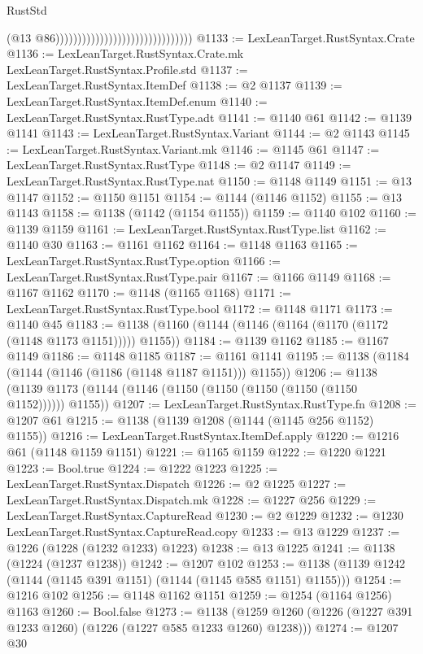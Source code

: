\begin{lexlean}{RustStd}
\begin{coremodule}
{\begin{coremodule}
{{{{{{{{{{{{{{{{{{{{{{{{{{{{{{{{{{                                                                (@13
                                                                  @86)))))))))))))))))))))))))))))))
@1133 := LexLeanTarget.RustSyntax.Crate
@1136 := LexLeanTarget.RustSyntax.Crate.mk LexLeanTarget.RustSyntax.Profile.std
@1137 := LexLeanTarget.RustSyntax.ItemDef
@1138 := @2 @1137
@1139 := LexLeanTarget.RustSyntax.ItemDef.enum
@1140 := LexLeanTarget.RustSyntax.RustType.adt
@1141 := @1140 @61
@1142 := @1139 @1141
@1143 := LexLeanTarget.RustSyntax.Variant
@1144 := @2 @1143
@1145 := LexLeanTarget.RustSyntax.Variant.mk
@1146 := @1145 @61
@1147 := LexLeanTarget.RustSyntax.RustType
@1148 := @2 @1147
@1149 := LexLeanTarget.RustSyntax.RustType.nat
@1150 := @1148 @1149
@1151 := @13 @1147
@1152 := @1150 @1151
@1154 := @1144 (@1146 @1152)
@1155 := @13 @1143
@1158 := @1138 (@1142 (@1154 @1155))
@1159 := @1140 @102
@1160 := @1139 @1159
@1161 := LexLeanTarget.RustSyntax.RustType.list
@1162 := @1140 @30
@1163 := @1161 @1162
@1164 := @1148 @1163
@1165 := LexLeanTarget.RustSyntax.RustType.option
@1166 := LexLeanTarget.RustSyntax.RustType.pair
@1167 := @1166 @1149
@1168 := @1167 @1162
@1170 := @1148 (@1165 @1168)
@1171 := LexLeanTarget.RustSyntax.RustType.bool
@1172 := @1148 @1171
@1173 := @1140 @45
@1183 := @1138 (@1160 (@1144 (@1146 (@1164 (@1170 (@1172 (@1148 @1173 @1151))))) @1155))
@1184 := @1139 @1162
@1185 := @1167 @1149
@1186 := @1148 @1185
@1187 := @1161 @1141
@1195 := @1138 (@1184 (@1144 (@1146 (@1186 (@1148 @1187 @1151))) @1155))
@1206 := @1138 (@1139 @1173 (@1144 (@1146 (@1150 (@1150 (@1150 (@1150 (@1150 @1152)))))) @1155))
@1207 := LexLeanTarget.RustSyntax.RustType.fn
@1208 := @1207 @61
@1215 := @1138 (@1139 @1208 (@1144 (@1145 @256 @1152) @1155))
@1216 := LexLeanTarget.RustSyntax.ItemDef.apply
@1220 := @1216 @61 (@1148 @1159 @1151)
@1221 := @1165 @1159
@1222 := @1220 @1221
@1223 := Bool.true
@1224 := @1222 @1223
@1225 := LexLeanTarget.RustSyntax.Dispatch
@1226 := @2 @1225
@1227 := LexLeanTarget.RustSyntax.Dispatch.mk
@1228 := @1227 @256
@1229 := LexLeanTarget.RustSyntax.CaptureRead
@1230 := @2 @1229
@1232 := @1230 LexLeanTarget.RustSyntax.CaptureRead.copy
@1233 := @13 @1229
@1237 := @1226 (@1228 (@1232 @1233) @1223)
@1238 := @13 @1225
@1241 := @1138 (@1224 (@1237 @1238))
@1242 := @1207 @102
@1253 := @1138 (@1139 @1242 (@1144 (@1145 @391 @1151) (@1144 (@1145 @585 @1151) @1155)))
@1254 := @1216 @102
@1256 := @1148 @1162 @1151
@1259 := @1254 (@1164 @1256) @1163
@1260 := Bool.false
@1273 := @1138 (@1259 @1260 (@1226 (@1227 @391 @1233 @1260) (@1226 (@1227 @585 @1233 @1260) @1238)))
@1274 := @1207 @30
}}}}}}}}}}}}}}}}}}}}}}}}}}}}}}}}}}
\end{coremodule}}
\end{coremodule}
\end{lexlean}
